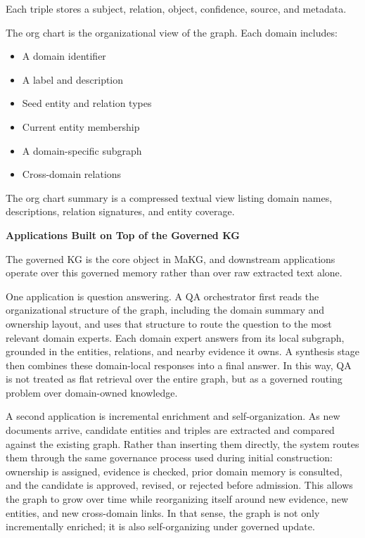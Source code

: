Each triple stores a subject, relation, object, confidence, source, and
metadata.

The org chart is the organizational view of the graph. Each domain
includes:

\begin{itemize}
\item
  A domain identifier
\item
  A label and description
\item
  Seed entity and relation types
\item
  Current entity membership
\item
  A domain-specific subgraph
\item
  Cross-domain relations
\end{itemize}

The org chart summary is a compressed textual view listing domain names,
descriptions, relation signatures, and entity coverage.

\textbf{Applications Built on Top of the Governed KG}

The governed KG is the core object in MaKG, and downstream applications
operate over this governed memory rather than over raw extracted text
alone.

One application is question answering. A QA orchestrator first reads the
organizational structure of the graph, including the domain summary and
ownership layout, and uses that structure to route the question to the
most relevant domain experts. Each domain expert answers from its local
subgraph, grounded in the entities, relations, and nearby evidence it
owns. A synthesis stage then combines these domain-local responses into
a final answer. In this way, QA is not treated as flat retrieval over
the entire graph, but as a governed routing problem over domain-owned
knowledge.

A second application is incremental enrichment and self-organization. As
new documents arrive, candidate entities and triples are extracted and
compared against the existing graph. Rather than inserting them
directly, the system routes them through the same governance process
used during initial construction: ownership is assigned, evidence is
checked, prior domain memory is consulted, and the candidate is
approved, revised, or rejected before admission. This allows the graph
to grow over time while reorganizing itself around new evidence, new
entities, and new cross-domain links. In that sense, the graph is not
only incrementally enriched; it is also self-organizing under governed
update.

